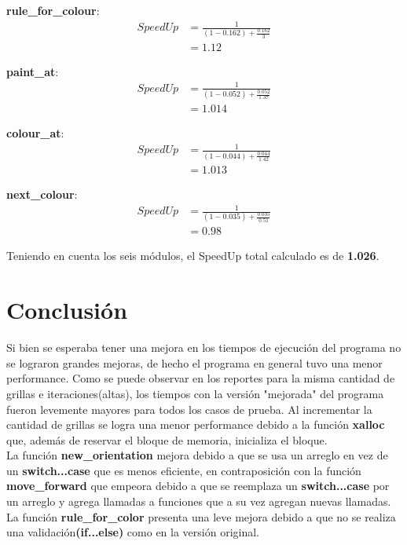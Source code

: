 \documentclass[a4paper, 10pt, twoside, notitlepage]{article}
\begin{document}
\textbf{rule\_for\_colour}:
\begin{equation*} 
\begin{split}
 SpeedUp &=\frac{1}{(1-0.162) + \frac{0.162}{3}} \\
  &= 1.12
\end{split}
\end{equation*}

\textbf{paint\_at}:
\begin{equation*} 
\begin{split}
 SpeedUp &=\frac{1}{(1-0.052) + \frac{0.052}{1.37}} \\
  &= 1.014
\end{split}
\end{equation*}

\textbf{colour\_at}:
\begin{equation*} 
\begin{split}
 SpeedUp &=\frac{1}{(1-0.044) + \frac{0.044}{1.42}} \\
  &= 1.013
\end{split}
\end{equation*}

\textbf{next\_colour}:
\begin{equation*} 
\begin{split}
 SpeedUp &=\frac{1}{(1-0.035) + \frac{0.035}{0.51}} \\
  &= 0.98
\end{split}
\end{equation*}

Teniendo en cuenta los seis módulos, el SpeedUp total calculado es de \textbf{1.026}.
\newpage

\section{Conclusión}

Si bien se esperaba tener una mejora en los tiempos de ejecución del programa no se lograron grandes mejoras, de hecho el programa en general tuvo una menor performance. Como se puede observar en los reportes para la misma cantidad de grillas e iteraciones(altas), los tiempos con la versión "mejorada" del programa fueron levemente mayores para todos los casos de prueba. Al incrementar la cantidad de grillas se logra una menor performance debido a la función \textbf{xalloc} que, además de reservar el bloque de memoria, inicializa el bloque. \\

La función \textbf{new\_orientation} mejora debido a que se usa un arreglo en vez de un \textbf{switch...case} que es menos eficiente, en contraposición con la función \textbf{move\_forward} que empeora debido a que se reemplaza un \textbf{switch...case} por un arreglo y agrega llamadas a funciones que a su vez agregan nuevas llamadas. La función \textbf{rule\_for\_color} presenta una leve mejora debido a que no se realiza una validación\textbf{(if...else)} como en la versión original.
\end{document}
